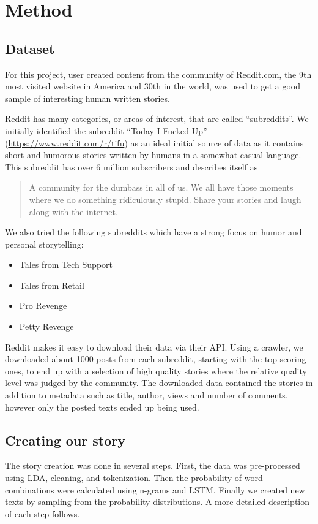 \documentclass[12pt,a4paper,utf8]{article}
\begin{document}
\section{Method}\label{sec:method}

\subsection{Dataset}

For this project, user created content from the community of Reddit.com, the 9th most visited website in America and 30th in the world\autocite{alexa}, was used to get a good sample of interesting human written stories.

Reddit has many categories, or areas of interest, that are called ``subreddits''. We initially identified the subreddit ``Today I Fucked Up'' (\url{https://www.reddit.com/r/tifu}) as an ideal initial source of data as it contains short and humorous stories written by humans in a somewhat casual language. This subreddit has over 6 million subscribers and describes itself as \begin{quote}
A community for the dumbass in all of us. We all have those moments where we do something ridiculously stupid. Share your stories and laugh along with the internet\autocite{tifu}.
\end{quote} We also tried the following subreddits which have a strong focus on humor and personal storytelling:
\begin{itemize}
  \item Tales from Tech Support
  \item Tales from Retail
  \item Pro Revenge
  \item Petty Revenge
\end{itemize}

Reddit makes it easy to download their data via their API\autocite{redditAPI}. Using a crawler, we downloaded about 1000 posts from each subreddit, starting with the top scoring ones, to end up with a selection of high quality stories where the relative quality level was judged by the community.
The downloaded data contained the stories in addition to metadata such as title, author, views and number of comments, however only the posted texts ended up being used.

\subsection{Creating our story}
The story creation was done in several steps. First, the data was pre-processed using LDA, cleaning, and tokenization. Then the probability of word combinations were calculated using n-grams and LSTM. Finally we created new texts by sampling from the probability distributions. A more detailed description of each step follows.
\end{document}
